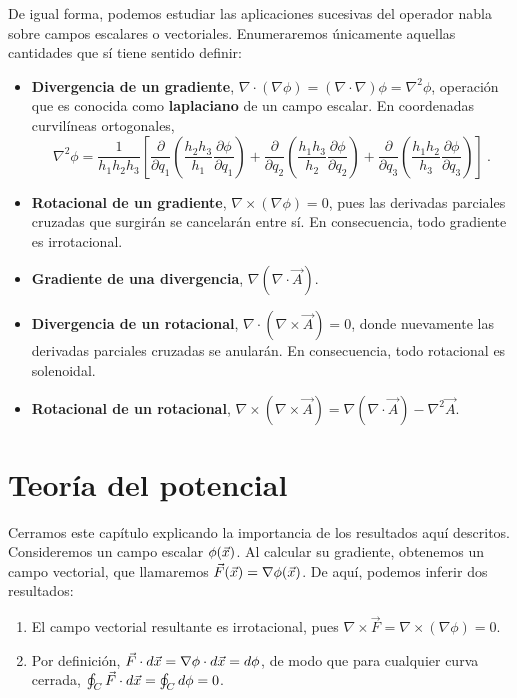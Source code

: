 De igual forma, podemos estudiar las aplicaciones sucesivas del operador nabla sobre campos escalares o vectoriales. Enumeraremos únicamente aquellas cantidades que sí tiene sentido definir:
\begin{itemize}
    \item \textbf{Divergencia de un gradiente}, $\nabla \cdot (\nabla \phi) = (\nabla \cdot \nabla) \phi = \nabla^2 \phi$, operación que es conocida como \textbf{laplaciano} de un campo escalar. En coordenadas curvilíneas ortogonales,
    \begin{equation}
        \nabla^2 \phi = \frac{1}{h_1 h_2 h_3}\left[ \frac{\partial}{\partial q_1} \left( \frac{h_2 h_3}{h_1} \frac{\partial \phi}{\partial q_1} \right) + \frac{\partial}{\partial q_2} \left( \frac{h_1 h_3}{h_2} \frac{\partial \phi}{\partial q_2} \right) + \frac{\partial}{\partial q_3} \left( \frac{h_1 h_2}{h_3} \frac{\partial \phi}{\partial q_3} \right) \right] \ .
    \end{equation}
    \item \textbf{Rotacional de un gradiente}, $\nabla \times (\nabla \phi) = 0$, pues las derivadas parciales cruzadas que surgirán se cancelarán entre sí. En consecuencia, todo gradiente es irrotacional.
    \item \textbf{Gradiente de una divergencia}, $\nabla (\nabla \cdot \vec{A})$.
    \item \textbf{Divergencia de un rotacional}, $\nabla \cdot (\nabla \times \vec{A}) = 0$, donde nuevamente las derivadas parciales cruzadas se anularán. En consecuencia, todo rotacional es solenoidal.
    \item \textbf{Rotacional de un rotacional}, $\nabla \times (\nabla \times \vec{A}) = \nabla (\nabla \cdot \vec{A}) - \nabla^2 \vec{A}$.
\end{itemize}



\section{Teoría del potencial}

Cerramos este capítulo explicando la importancia de los resultados aquí descritos. Consideremos un campo escalar $\phi(\vec{x})$. Al calcular su gradiente, obtenemos un campo vectorial, que llamaremos $\vec{F}(\vec{x}) = \nabla \phi(\vec{x})$. De aquí, podemos inferir dos resultados:
\begin{enumerate}
    \item El campo vectorial resultante es irrotacional, pues $\nabla \times \vec{F} = \nabla \times (\nabla \phi) = 0$.
    \item Por definición, $\vec{F} \cdot d\vec{x} = \nabla \phi \cdot d\vec{x} = d\phi$, de modo que para cualquier curva cerrada, $\oint_C \vec{F} \cdot d\vec{x} = \oint_C d\phi = 0$.
\end{enumerate}

